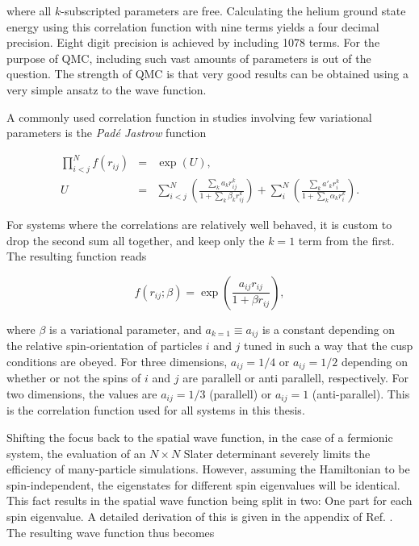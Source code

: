 where all $k$-subscripted parameters are free. Calculating the helium ground state energy using this correlation function with nine terms yields a four decimal precision. Eight digit precision is achieved by including 1078 terms. For the purpose of QMC, including such vast amounts of parameters is out of the question. The strength of QMC is that very good results can be obtained using a very simple ansatz to the wave function. 

A commonly used correlation function in studies involving few variational parameters is the \textit{Padé Jastrow} function

\begin{eqnarray*}
 \prod_{i<j}^Nf(r_{ij}) &=& \exp(U), \\
         U &=&  \sum_{i<j}^N\left(\frac{\sum_k a_kr_{ij}^k}{1 + \sum_k \beta_kr_{ij}^k}\right) + \sum_i^N\left(\frac{\sum_k a'_kr_i^k}{1 + \sum_k \alpha_kr_i^k}\right).
\end{eqnarray*}

For systems where the correlations are relatively well behaved, it is custom to drop the second sum all together, and keep only the $k=1$ term from the first. The resulting function reads

\begin{equation}
 \label{eq:jastrow}
 f(r_{ij}; \beta) = \exp\left(\frac{a_{ij} r_{ij}}{1 + \beta r_{ij}}\right),
\end{equation}

where $\beta$ is a variational parameter, and $a_{k=1} \equiv a_{ij}$ is a constant depending on the relative spin-orientation of particles $i$ and $j$ tuned in such a way that the cusp conditions are obeyed. For three dimensions, $a_{ij} = 1/4$ or $a_{ij} = 1/2$ depending on whether or not the spins of $i$ and $j$ are parallell or anti parallell, respectively\cite{abInitioMC}. For two dimensions, the values are $a_{ij}=1/3$ (parallell) or $a_{ij}=1$ (anti-parallel)\cite{larseivind}. This is the correlation function used for all systems in this thesis.

Shifting the focus back to the spatial wave function, in the case of a fermionic system, the evaluation of an $N\times N$ Slater determinant severely limits the efficiency of many-particle simulations. However, assuming the Hamiltonian to be spin-independent, the eigenstates for different spin eigenvalues will be identical. This fact results in the spatial wave function being split in two: One part for each spin eigenvalue. A detailed derivation of this is given in the appendix of Ref. \cite{QMCPHD2008}. The resulting wave function thus becomes

